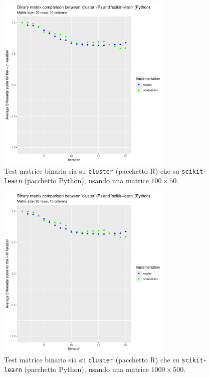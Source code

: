 \documentclass[a4paper, 12pt]{report}
\begin{document}
			\begin{figure}[H]
				\centering
				\includegraphics[width = 0.75\textwidth, page = 2]{results/Final_comparison.pdf}
				\caption{Test matrice binaria sia su \texttt{cluster} (pacchetto R) che su
				\texttt{scikit-learn} (pacchetto Python), usando una matrice $100 \times 50$.}
				\label{fig:cmp2}
			\end{figure}

			\begin{figure}[H]
				\centering
				\includegraphics[width = 0.75\textwidth, page = 3]{results/Final_comparison.pdf}
				\caption{Test matrice binaria sia su \texttt{cluster} (pacchetto R) che su
				\texttt{scikit-learn} (pacchetto Python), usando una matrice $1000 \times 500$.}
				\label{fig:cmp3}
			\end{figure}
\end{document}
